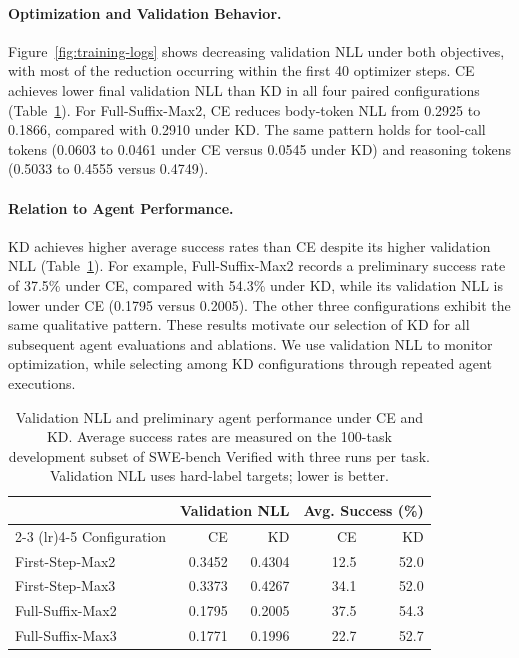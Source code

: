 \paragraph{Optimization and Validation Behavior.}
Figure~\ref{fig:training-logs} shows decreasing validation NLL
under both objectives, with most of the reduction occurring
within the first 40 optimizer steps.
CE achieves lower final validation NLL than KD in all four
paired configurations
(Table~\ref{tab:ce-kd-diagnostics}).
For Full-Suffix-Max2, CE reduces body-token NLL from 0.2925
to 0.1866, compared with 0.2910 under KD.
The same pattern holds for tool-call tokens
(0.0603 to 0.0461 under CE versus 0.0545 under KD)
and reasoning tokens
(0.5033 to 0.4555 versus 0.4749).

\paragraph{Relation to Agent Performance.}
KD achieves higher average success rates than CE despite its
higher validation NLL (Table~\ref{tab:ce-kd-diagnostics}).
For example, Full-Suffix-Max2 records a preliminary success
rate of 37.5\% under CE, compared with 54.3\% under KD,
while its validation NLL is lower under CE
(0.1795 versus 0.2005).
The other three configurations exhibit the same qualitative
pattern. These results motivate
our selection of KD for all subsequent agent evaluations
and ablations. We use validation NLL to monitor optimization,
while selecting among KD configurations through repeated
agent executions.

\begin{table}
  \centering
  \small
  \caption{Validation NLL and preliminary agent performance under CE and KD.
  Average success rates are measured on the 100-task development subset of SWE-bench Verified
  with three runs per task. Validation NLL uses hard-label targets; lower is better.}
  \label{tab:ce-kd-diagnostics}
  \begin{tabular}{lrrrr}
    \toprule
    & \multicolumn{2}{c}{Validation NLL}
    & \multicolumn{2}{c}{Avg. Success (\%)} \\
    \cmidrule(lr){2-3}
    \cmidrule(lr){4-5}
    Configuration & CE & KD & CE & KD \\
    \midrule
    First-Step-Max2  & 0.3452 & 0.4304 & 12.5 & 52.0 \\
    First-Step-Max3  & 0.3373 & 0.4267 & 34.1 & 52.0 \\
    Full-Suffix-Max2 & 0.1795 & 0.2005 & 37.5 & 54.3 \\
    Full-Suffix-Max3 & 0.1771 & 0.1996 & 22.7 & 52.7 \\
    \bottomrule
  \end{tabular}
\end{table}




